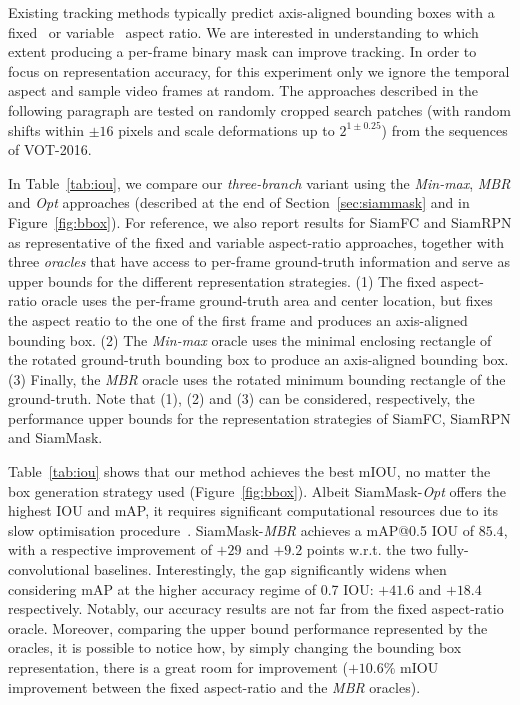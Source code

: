 \documentclass[10pt,twocolumn,letterpaper]{article}
\newcommand{\mypar}[1]{\smallskip\noindent {\bf #1}\enskip}
\begin{document}
\mypar{How much does the object representation matter?}
Existing tracking methods typically predict axis-aligned bounding boxes with a fixed~\cite{bertinetto2016fully,henriques2015tracking,danelljan2015learning,lukezic2017discriminative} or variable~\cite{SiamRPN,held2016learning,zhu2018distractor} aspect ratio.
We are interested in understanding to which extent producing a per-frame binary mask can improve tracking.
In order to focus on representation accuracy, for this experiment only we ignore the temporal aspect and sample video frames at random.
The approaches described in the following paragraph are tested on randomly cropped search patches (with random shifts within $\pm16$ pixels and scale deformations up to $2^{1\pm0.25}$) from the sequences of VOT-2016.


In Table~\ref{tab:iou}, we compare our \emph{three-branch} variant using the \emph{Min-max}, \emph{MBR} and \emph{Opt} approaches (described at the end of Section~\ref{sec:siammask} and in Figure~\ref{fig:bbox}).
For reference, we also report results for SiamFC and SiamRPN as representative of the fixed and variable aspect-ratio approaches, together with three \emph{oracles} that have access to per-frame ground-truth information and serve as upper bounds for the different representation strategies.
(1) The fixed aspect-ratio oracle uses the per-frame ground-truth area and center location, but fixes the aspect reatio to the one of the first frame and produces an axis-aligned bounding box.
(2) The \emph{Min-max} oracle uses the minimal enclosing rectangle of the rotated ground-truth bounding box to produce an axis-aligned bounding box.
(3) Finally, the \textit{MBR} oracle uses the rotated minimum bounding rectangle of the ground-truth.
Note that (1), (2) and (3) can be considered, respectively, the performance upper bounds for the representation strategies of SiamFC, SiamRPN and SiamMask.

Table~\ref{tab:iou} shows that our method achieves the best mIOU, no matter the box generation strategy used (Figure~\ref{fig:bbox}).
Albeit SiamMask-\textit{Opt} offers the highest IOU and mAP, it requires significant computational resources due to its slow optimisation procedure~\cite{vojir2017pixel}. 
SiamMask-\textit{MBR} achieves a mAP@0.5 IOU  of $85.4$, with a respective improvement of $+29$ and $+9.2$ points w.r.t. the two fully-convolutional baselines.
Interestingly, the gap significantly widens when considering mAP at the higher accuracy regime of 0.7 IOU: $+41.6$ and $+18.4$ respectively.
Notably, our accuracy results are not far from the fixed aspect-ratio oracle.
Moreover, comparing the upper bound performance represented by the oracles, it is possible to notice how, by simply changing the bounding box representation, there is a great room for improvement (\eg $+10.6\%$ mIOU improvement between the fixed aspect-ratio and the \textit{MBR} oracles).
\end{document}
